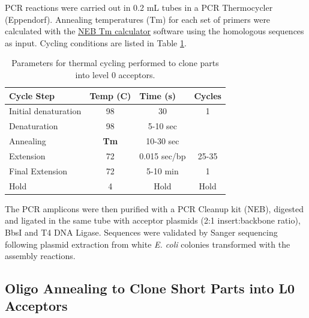 PCR reactions were carried out in 0.2 mL tubes in a PCR Thermocycler (Eppendorf). Annealing temperatures (Tm) for each set of primers were calculated with the \href{https://tmcalculator.neb.com/#!/main}{NEB Tm calculator} software using the homologous sequences as input. Cycling conditions are listed in Table \ref{table:cycling}.


\begin{table}[H]
\centering
\begin{tabular}{|l|c|c|c|}
\hline
\textbf{Cycle Step} & \multicolumn{1}{l|}{\textbf{Temp (C)}} & \multicolumn{1}{l|}{\textbf{Time  (s)}} & \multicolumn{1}{l|}{\textbf{Cycles}} \\ \hline
Initial denaturation & 98 & 30 & 1 \\ \hline
Denaturation & 98 & 5-10 sec &  \\ \cline{1-3}
Annealing & {\color[HTML]{D10E0E} \textbf{Tm}} & 10-30 sec &  \\ \cline{1-3}
Extension & 72 & 0.015 sec/bp & \multirow{-3}{*}{25-35} \\ \hline
Final Extension & 72 & 5-10 min & 1 \\ \hline
Hold & 4 & Hold & Hold \\ \hline
\end{tabular}
\caption{Parameters for thermal cycling performed to clone parts into level 0 acceptors.}
\label{table:cycling}
\end{table}

The PCR amplicons were then purified with a PCR Cleanup kit (NEB), digested and ligated in the same tube with acceptor plasmids (2:1 insert:backbone ratio), BbsI and T4 DNA Ligase. Sequences were validated by Sanger sequencing following plasmid extraction from white \textit{E. coli} colonies transformed with the assembly reactions.



\subsection{Oligo Annealing to Clone Short Parts into L0 Acceptors}
\label{sec:Annealing}

